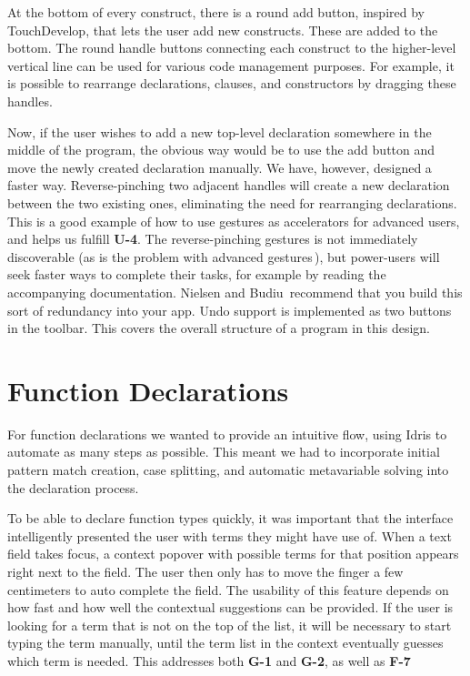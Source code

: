 At the bottom of every construct, there is a round add button, inspired by TouchDevelop, that lets the user add new constructs. These are added to the bottom. 
The round handle buttons connecting each construct to the higher-level vertical line can be used for various code management purposes. 
For example, it is possible to rearrange declarations, clauses, and constructors by dragging these handles. 

Now, if the user wishes to add a new top-level declaration somewhere in the middle of the program, the obvious way would be to use the add button and move the newly created declaration manually. We have, however, designed a faster way.
Reverse-pinching two adjacent handles will create a new declaration between the two existing ones, eliminating the need for rearranging declarations. 
This is a good example of how to use gestures as accelerators for advanced users, and helps us fulfill \textbf{U-4}.
The reverse-pinching gestures is not immediately discoverable (as is the problem with advanced gestures\,\cite[p 141]{nielsen2013mobile}), but power-users will seek faster ways to complete their tasks, for example by reading the accompanying documentation. 
Nielsen and Budiu\,\cite[p 143]{nielsen2013mobile} recommend that you build this sort of redundancy into your app. 
Undo support is implemented as two buttons in the toolbar.
This covers the overall structure of a program in this design.


\section{Function Declarations}
For function declarations we wanted to provide an intuitive flow, using Idris to automate as many steps as possible. 
This meant we had to incorporate initial pattern match creation, case splitting, and automatic metavariable solving into the declaration process.

To be able to declare function types quickly, it was important that the interface intelligently presented the user with terms they might have use of.
When a text field takes focus, a context popover with possible terms for that position appears right next to the field. 
The user then only has to move the finger a few centimeters to auto complete the field. 
The usability of this feature depends on how fast and how well the contextual suggestions can be provided.
If the user is looking for a term that is not on the top of the list, it will be necessary to start typing the term manually, until the term list in the context eventually guesses which term is needed. This addresses both \textbf{G-1} and \textbf{G-2}, as well as \textbf{F-7}


